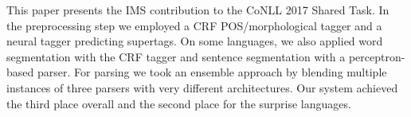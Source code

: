 This paper presents the IMS contribution to the CoNLL 2017 Shared Task. In the preprocessing step we employed a CRF POS/morphological tagger and a neural tagger predicting supertags. On some languages, we also applied word segmentation with the CRF tagger and sentence segmentation with a perceptron-based parser. For parsing we took an ensemble approach by blending multiple instances of three parsers with very different architectures. Our system achieved the third place overall and the second place for the surprise languages.
